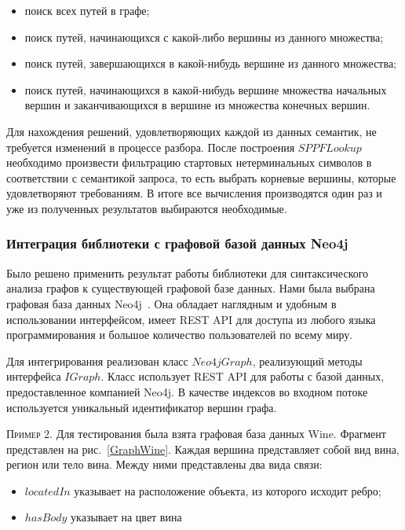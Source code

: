 \begin{itemize}
\item поиск всех путей в графе;
\item поиск путей, начинающихся с какой-либо вершины из данного
множества;
\item поиск путей, завершающихся в какой-нибудь вершине из данного
множества;
\item поиск путей, начинающихся в какой-нибудь вершине множества
начальных вершин и заканчивающихся в вершине из множества
конечных вершин.
\end{itemize}

Для нахождения решений, удовлетворяющих каждой из данных семантик, не требуется изменений в процессе разбора. После построения $SPPFLookup$ необходимо произвести фильтрацию стартовых нетерминальных символов в соответствии с семантикой запроса, то есть выбрать корневые вершины, которые удовлетворяют требованиям. В итоге все вычисления производятся один раз и уже из полученных результатов выбираются необходимые. 

\subsubsection{Интеграция библиотеки с графовой базой данных Neo4j}

Было решено применить результат работы библиотеки для синтаксического анализа графов к существующей графовой базе
данных. Нами была выбрана графовая база данных Neo4j~\cite{Neo4j}. Она обладает наглядным и удобным в использовании интерфейсом, имеет REST API для доступа из любого языка программирования и большое количество пользователей по всему миру.

Для интегрирования реализован класс $Neo4jGraph$, реализующий методы интерфейса $IGraph$. Класс использует REST API для работы с базой данных, предоставленное компанией Neo4j. В качестве индексов во входном потоке используется уникальный идентификатор вершин графа.

\textsc{Пример 2.} 
Для тестирования была взята графовая база данных Wine. Фрагмент представлен на рис.~\ref{GraphWine}. Каждая вершина представляет собой вид вина, регион или тело вина. Между ними представлены два вида связи: 
\begin{itemize}
\item $locatedIn$ указывает на расположение объекта, из которого исходит ребро;
\item $hasBody$ указывает на цвет вина
\end{itemize}

